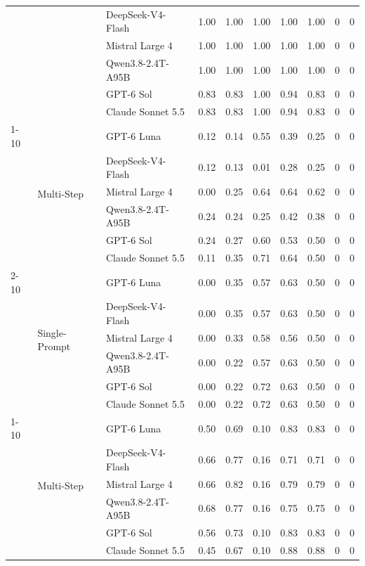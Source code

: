 \begin{tabular}{lllrrrrrrr}
 &  & DeepSeek-V4-Flash & 1.00 & 1.00 & 1.00 & 1.00 & 1.00 & 0 & 0 \\
 &  & Mistral Large 4 & 1.00 & 1.00 & 1.00 & 1.00 & 1.00 & 0 & 0 \\
 &  & Qwen3.8-2.4T-A95B & 1.00 & 1.00 & 1.00 & 1.00 & 1.00 & 0 & 0 \\
 &  & GPT-6 Sol & 0.83 & 0.83 & 1.00 & 0.94 & 0.83 & 0 & 0 \\
 &  & Claude Sonnet 5.5 & 0.83 & 0.83 & 1.00 & 0.94 & 0.83 & 0 & 0 \\
\cline{1-10} \cline{2-10}
\multirow[t]{12}{*}{hmdaz} & \multirow[t]{6}{*}{Multi-Step} & GPT-6 Luna & 0.12 & 0.14 & 0.55 & 0.39 & 0.25 & 0 & 0 \\
 &  & DeepSeek-V4-Flash & 0.12 & 0.13 & 0.01 & 0.28 & 0.25 & 0 & 0 \\
 &  & Mistral Large 4 & 0.00 & 0.25 & 0.64 & 0.64 & 0.62 & 0 & 0 \\
 &  & Qwen3.8-2.4T-A95B & 0.24 & 0.24 & 0.25 & 0.42 & 0.38 & 0 & 0 \\
 &  & GPT-6 Sol & 0.24 & 0.27 & 0.60 & 0.53 & 0.50 & 0 & 0 \\
 &  & Claude Sonnet 5.5 & 0.11 & 0.35 & 0.71 & 0.64 & 0.50 & 0 & 0 \\
\cline{2-10}
 & \multirow[t]{6}{*}{Single-Prompt} & GPT-6 Luna & 0.00 & 0.35 & 0.57 & 0.63 & 0.50 & 0 & 0 \\
 &  & DeepSeek-V4-Flash & 0.00 & 0.35 & 0.57 & 0.63 & 0.50 & 0 & 0 \\
 &  & Mistral Large 4 & 0.00 & 0.33 & 0.58 & 0.56 & 0.50 & 0 & 0 \\
 &  & Qwen3.8-2.4T-A95B & 0.00 & 0.22 & 0.57 & 0.63 & 0.50 & 0 & 0 \\
 &  & GPT-6 Sol & 0.00 & 0.22 & 0.72 & 0.63 & 0.50 & 0 & 0 \\
 &  & Claude Sonnet 5.5 & 0.00 & 0.22 & 0.72 & 0.63 & 0.50 & 0 & 0 \\
\cline{1-10} \cline{2-10}
\multirow[t]{12}{*}{hmda_checks} & \multirow[t]{6}{*}{Multi-Step} & GPT-6 Luna & 0.50 & 0.69 & 0.10 & 0.83 & 0.83 & 0 & 0 \\
 &  & DeepSeek-V4-Flash & 0.66 & 0.77 & 0.16 & 0.71 & 0.71 & 0 & 0 \\
 &  & Mistral Large 4 & 0.66 & 0.82 & 0.16 & 0.79 & 0.79 & 0 & 0 \\
 &  & Qwen3.8-2.4T-A95B & 0.68 & 0.77 & 0.16 & 0.75 & 0.75 & 0 & 0 \\
 &  & GPT-6 Sol & 0.56 & 0.73 & 0.10 & 0.83 & 0.83 & 0 & 0 \\
 &  & Claude Sonnet 5.5 & 0.45 & 0.67 & 0.10 & 0.88 & 0.88 & 0 & 0 \\

\end{tabular}
